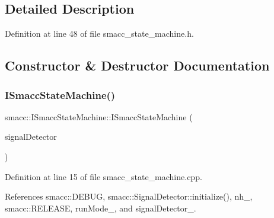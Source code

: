\subsection{Detailed Description}


Definition at line 48 of file smacc\+\_\+state\+\_\+machine.\+h.



\subsection{Constructor \& Destructor Documentation}
\mbox{\label{classsmacc_1_1ISmaccStateMachine_a497c2185584adbec3298d4000277b75e}} 
\subsubsection{\texorpdfstring{I\+Smacc\+State\+Machine()}{ISmaccStateMachine()}}
{\footnotesize\ttfamily smacc\+::\+I\+Smacc\+State\+Machine\+::\+I\+Smacc\+State\+Machine (\begin{DoxyParamCaption}\item[{\hyperlink{classsmacc_1_1SignalDetector}{Signal\+Detector} $\ast$}]{signal\+Detector }\end{DoxyParamCaption})}



Definition at line 15 of file smacc\+\_\+state\+\_\+machine.\+cpp.



References smacc\+::\+D\+E\+B\+UG, smacc\+::\+Signal\+Detector\+::initialize(), nh\+\_\+, smacc\+::\+R\+E\+L\+E\+A\+SE, run\+Mode\+\_\+, and signal\+Detector\+\_\+.


